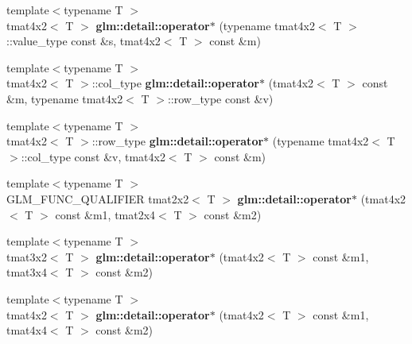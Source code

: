 \begin{DoxyCompactItemize}
\item 
\hypertarget{namespaceglm_1_1detail_ad78fbcf8715901fe53ada4a5e8434794}{{\footnotesize template$<$typename T $>$ }\\tmat4x2$<$ \-T $>$ {\bfseries glm\-::detail\-::operator$\ast$} (typename tmat4x2$<$ \-T $>$\-::value\-\_\-type const \&s, tmat4x2$<$ \-T $>$ const \&m)}\label{namespaceglm_1_1detail_ad78fbcf8715901fe53ada4a5e8434794}

\item 
\hypertarget{namespaceglm_1_1detail_ad21d019c538c888a871a7cadb466c1bc}{{\footnotesize template$<$typename T $>$ }\\tmat4x2$<$ \-T $>$\-::col\-\_\-type {\bfseries glm\-::detail\-::operator$\ast$} (tmat4x2$<$ \-T $>$ const \&m, typename tmat4x2$<$ \-T $>$\-::row\-\_\-type const \&v)}\label{namespaceglm_1_1detail_ad21d019c538c888a871a7cadb466c1bc}

\item 
\hypertarget{namespaceglm_1_1detail_ae62655684421c64caed1a70d32a9b182}{{\footnotesize template$<$typename T $>$ }\\tmat4x2$<$ \-T $>$\-::row\-\_\-type {\bfseries glm\-::detail\-::operator$\ast$} (typename tmat4x2$<$ \-T $>$\-::col\-\_\-type const \&v, tmat4x2$<$ \-T $>$ const \&m)}\label{namespaceglm_1_1detail_ae62655684421c64caed1a70d32a9b182}

\item 
\hypertarget{namespaceglm_1_1detail_aba7326ac44c2bb0c27924148035726ab}{{\footnotesize template$<$typename T $>$ }\\\-G\-L\-M\-\_\-\-F\-U\-N\-C\-\_\-\-Q\-U\-A\-L\-I\-F\-I\-E\-R tmat2x2$<$ \-T $>$ {\bfseries glm\-::detail\-::operator$\ast$} (tmat4x2$<$ \-T $>$ const \&m1, tmat2x4$<$ \-T $>$ const \&m2)}\label{namespaceglm_1_1detail_aba7326ac44c2bb0c27924148035726ab}

\item 
\hypertarget{namespaceglm_1_1detail_ace95ea6c32a3b47a6b5ca6f575682a08}{{\footnotesize template$<$typename T $>$ }\\tmat3x2$<$ \-T $>$ {\bfseries glm\-::detail\-::operator$\ast$} (tmat4x2$<$ \-T $>$ const \&m1, tmat3x4$<$ \-T $>$ const \&m2)}\label{namespaceglm_1_1detail_ace95ea6c32a3b47a6b5ca6f575682a08}

\item 
\hypertarget{namespaceglm_1_1detail_ab024939766a731271781b5aec9015f66}{{\footnotesize template$<$typename T $>$ }\\tmat4x2$<$ \-T $>$ {\bfseries glm\-::detail\-::operator$\ast$} (tmat4x2$<$ \-T $>$ const \&m1, tmat4x4$<$ \-T $>$ const \&m2)}\label{namespaceglm_1_1detail_ab024939766a731271781b5aec9015f66}


\end{DoxyCompactItemize}
